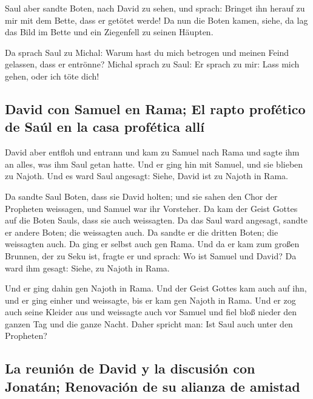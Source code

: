  Saul aber sandte Boten, nach David zu sehen, und sprach:
Bringet ihn herauf zu mir mit dem Bette, dass er getötet werde!
 Da nun die Boten kamen, siehe, da lag das Bild im Bette
und ein Ziegenfell zu seinen Häupten.

 Da sprach Saul zu Michal: Warum hast du mich betrogen
und meinen Feind gelassen, dass er entrönne? Michal sprach zu Saul: Er
sprach zu mir: Lass mich gehen, oder ich töte dich!

\hypertarget{david-con-samuel-en-rama-el-rapto-profuxe9tico-de-sauxfal-en-la-casa-profuxe9tica-alluxed}{%
\subsection{David con Samuel en Rama; El rapto profético de Saúl en la
casa profética
allí}\label{david-con-samuel-en-rama-el-rapto-profuxe9tico-de-sauxfal-en-la-casa-profuxe9tica-alluxed}}

 David aber entfloh und entrann und kam zu Samuel nach
Rama und sagte ihm an alles, was ihm Saul getan hatte. Und er ging hin
mit Samuel, und sie blieben zu Najoth.  Und es ward Saul
angesagt: Siehe, David ist zu Najoth in Rama.

 Da sandte Saul Boten, dass sie David holten; und sie
sahen den Chor der Propheten weissagen, und Samuel war ihr Vorsteher. Da
kam der Geist Gottes auf die Boten Sauls, dass sie auch weissagten.
 Da das Saul ward angesagt, sandte er andere Boten; die
weissagten auch. Da sandte er die dritten Boten; die weissagten auch.
 Da ging er selbst auch gen Rama. Und da er kam zum
großen Brunnen, der zu Seku ist, fragte er und sprach: Wo ist Samuel und
David? Da ward ihm gesagt: Siehe, zu Najoth in Rama.

 Und er ging dahin gen Najoth in Rama. Und der Geist
Gottes kam auch auf ihn, und er ging einher und weissagte, bis er kam
gen Najoth in Rama.  Und er zog auch seine Kleider aus
und weissagte auch vor Samuel und fiel bloß nieder den ganzen Tag und
die ganze Nacht. Daher spricht man: Ist Saul auch unter den Propheten?

\hypertarget{la-reuniuxf3n-de-david-y-la-discusiuxf3n-con-jonatuxe1n-renovaciuxf3n-de-su-alianza-de-amistad}{%
\subsection{La reunión de David y la discusión con Jonatán; Renovación
de su alianza de
amistad}\label{la-reuniuxf3n-de-david-y-la-discusiuxf3n-con-jonatuxe1n-renovaciuxf3n-de-su-alianza-de-amistad}}

